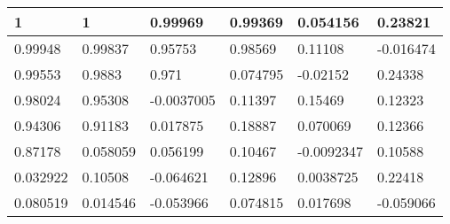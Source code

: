 \begin{tabular}{|l|l|l|l|l|l|}
\hline
1&1&0.99969&0.99369&0.054156&0.23821\\\hline
0.99948&0.99837&0.95753&0.98569&0.11108&-0.016474\\\hline
0.99553&0.9883&0.971&0.074795&-0.02152&0.24338\\\hline
0.98024&0.95308&-0.0037005&0.11397&0.15469&0.12323\\\hline
0.94306&0.91183&0.017875&0.18887&0.070069&0.12366\\\hline
0.87178&0.058059&0.056199&0.10467&-0.0092347&0.10588\\\hline
0.032922&0.10508&-0.064621&0.12896&0.0038725&0.22418\\\hline
0.080519&0.014546&-0.053966&0.074815&0.017698&-0.059066\\\hline
\end{tabular}
